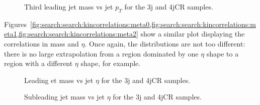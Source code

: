 \begin{figure}[!ht]
  \centering
  

    
  \caption{Third leading jet mass vs jet $p_T$ for the 3j and 4jCR samples.}
           
  \label{fig:search:search:kincorrelations:mpt2}
\end{figure}


Figures~\ref{fig:search:search:kincorrelations:meta0,fig:search:search:kincorrelations:meta1,fig:search:search:kincorrelations:meta2} show a similar plot displaying the correlations in mass and $\eta$. Once again, the distributions are not too different: there is no large extrapolation from a region dominated by one $\eta$ shape to a region with a different $\eta$ shape, for example.

\begin{figure}[!ht]
  \centering
  

    
  \caption{Leading et mass vs jet $\eta$ for the 3j and 4jCR samples.}
           
  \label{fig:search:search:kincorrelations:meta0}
\end{figure}

\begin{figure}[!ht]
  \centering
  

    
  \caption{Subleading jet mass vs jet $\eta$ for the 3j and 4jCR samples.}
           
  \label{fig:search:search:kincorrelations:meta1}
\end{figure}


